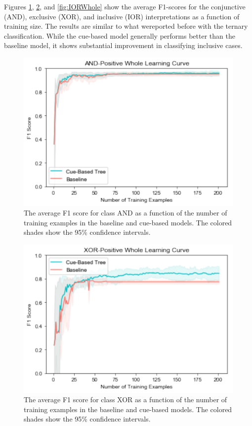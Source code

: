 \documentclass[floatsintext,man]{apa6}
\theoremstyle{definition}
\theoremstyle{definition}
\theoremstyle{definition}
\theoremstyle{remark}
\begin{document}
Figures \ref{fig:ANDWhole}, \ref{fig:XORWhole}, and \ref{fig:IORWhole}
show the average F1-scores for the conjunctive (AND), exclusive (XOR),
and inclusive (IOR) interpretations as a function of training size. The
results are similar to what wereported before with the ternary
classification. While the cue-based model generally performs better than
the baseline model, it shows substantial improvement in classifying
inclusive cases.

\begin{figure}
\centering
\includegraphics{figs/ANDWhole-1.pdf}
\caption{\label{fig:ANDWhole}The average F1 score for class AND as a
function of the number of training examples in the baseline and
cue-based models. The colored shades show the 95\% confidence
intervals.}
\end{figure}

\begin{figure}
\centering
\includegraphics{figs/XORWhole-1.pdf}
\caption{\label{fig:XORWhole}The average F1 score for class XOR as a
function of the number of training examples in the baseline and
cue-based models. The colored shades show the 95\% confidence
intervals.}
\end{figure}
\end{document}
